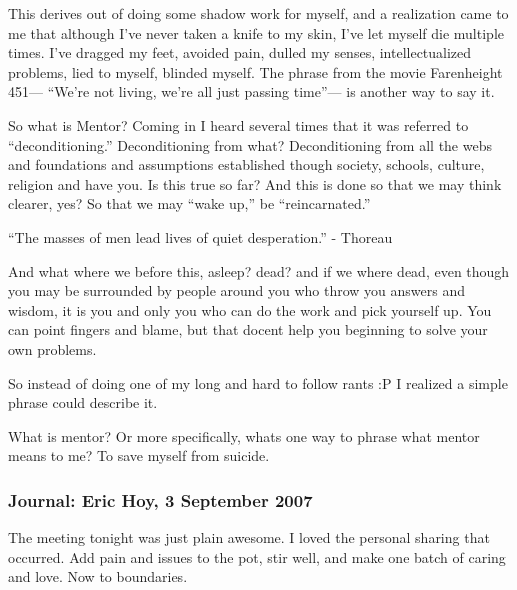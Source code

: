 This derives out of doing some shadow work for myself, and a realization came to me that although I've never taken a knife to my skin, I've let myself die multiple times. I've dragged my feet, avoided pain, dulled my senses, intellectualized problems, lied to myself, blinded myself. The phrase from the movie Farenheight 451--- ``We're not living, we're all just passing time''--- is another way to say it.
 
So what is Mentor? Coming in I heard several times that it was referred to ``deconditioning.'' Deconditioning from what? Deconditioning from all the webs and foundations and assumptions established though society, schools, culture, religion and have you. Is this true so far? And this is done so that we may think clearer, yes? So that we may ``wake up,'' be ``reincarnated.''
 
``The masses of men lead lives of quiet desperation.'' - Thoreau
 
And what where we before this, asleep? dead? and if we where dead, even though you may be surrounded by people around you who throw you answers and wisdom, it is you and only you who can do the work and pick yourself up. You can point fingers and blame, but that docent help you beginning to solve your own problems.
 
So instead of doing one of my long and hard to follow rants :P I realized a simple phrase could describe it.
 
What is mentor? Or more specifically, whats one way to phrase what mentor means to me?
To save myself from suicide.

\subsubsection{Journal: Eric Hoy, 3 September 2007}

The meeting tonight was just plain awesome. I loved the personal sharing that occurred. Add pain and issues to the pot, stir well, and make one batch of caring and love. Now to boundaries.

